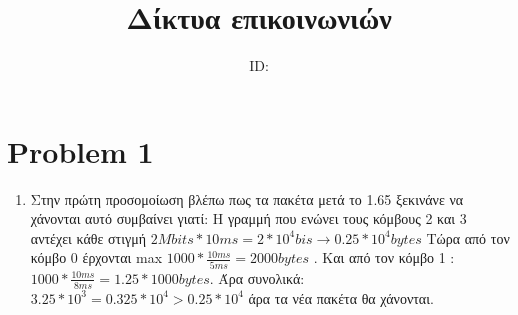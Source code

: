 \documentclass{article}
\title{Δίκτυα επικοινωνιών \\ \exerciseset}
\author{\studentname \qquad  ID: \suid}
\begin{document}
\maketitle

\section*{Problem 1}
\begin{enumerate}
\item []
Στην πρώτη προσομοίωση βλέπω πως τα πακέτα μετά το 1.65 ξεκινάνε να χάνονται αυτό συμβαίνει γιατί: Η γραμμή που ενώνει τους κόμβους 2 και 3 αντέχει κάθε στιγμή $2Mbits * 10ms=2*10^4bis \rightarrow 0.25*10^4bytes$ Τώρα από τον κόμβο 0
έρχονται max $1000*\frac{10ms}{5ms}=2000bytes$ . Και από τον κόμβο 1 :$1000*\frac{10ms}{8ms}=1.25*1000bytes$. Άρα συνολικά:
$3.25*10^3=0.325*10^4>0.25*10^4$ άρα τα νέα πακέτα θα χάνονται. \\
\begin{figure}[ht!]
	\centering
		
\end{figure}
\end{enumerate}
\title{}
\end{document}
